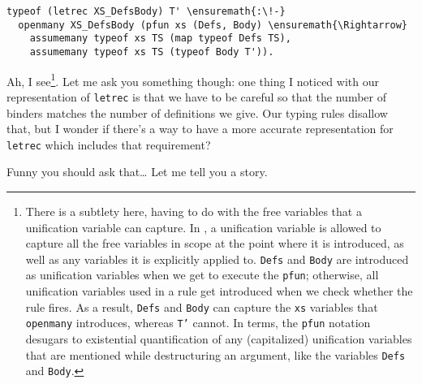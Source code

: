 \begin{verbatim}
typeof (letrec XS_DefsBody) T' \ensuremath{:\!-}
  openmany XS_DefsBody (pfun xs (Defs, Body) \ensuremath{\Rightarrow}
    assumemany typeof xs TS (map typeof Defs TS),
    assumemany typeof xs TS (typeof Body T')).
\end{verbatim}

\heroSTUDENT{} Ah, I
see\footnote{There is a subtlety here, having to do with the free variables that a unification variable
can capture. In \lamprolog, a unification variable is allowed to capture all the free variables in scope at the
point where it is introduced, as well as any variables it is explicitly applied to. \texttt{Defs} and \texttt{Body} are introduced as unification variables when we get to execute the \texttt{pfun}; otherwise, all unification variables used in a rule get introduced when we check whether the rule fires. As a result, \texttt{Defs} and \texttt{Body} can capture the \texttt{xs} variables that \texttt{openmany} introduces, whereas \texttt{T'} cannot. In \lamprolog terms, the \texttt{pfun} notation desugars to existential quantification of any (capitalized) unification variables that are mentioned while destructuring an argument, like the variables \texttt{Defs} and \texttt{Body}.}.
Let me ask you something though: one thing I noticed with our
representation of \texttt{letrec} is that we have to be careful so that
the number of binders matches the number of definitions we give. Our
typing rules disallow that, but I wonder if there's a way to have a more
accurate representation for \texttt{letrec} which includes that
requirement?

\heroADVISOR{} Funny you should ask that\ldots{} Let me tell you a story.
